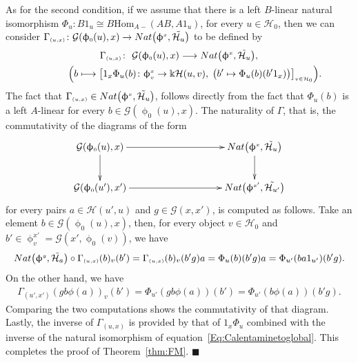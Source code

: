 \documentclass[11pt]{article}
\numberwithin{equation}{section}
\renewcommand{\hom}[3]{\mathrm{Hom}_{\Sscript{#1}}\left(#2, #3\right)}
\newcommand{\Ho}{\cH_{\Sscript{0}}}
\newcommand{\cG}{{\mathcal G}}
\newcommand{\cH}{{\mathcal H}}
\newcommand{\Sscript}[1]{\scriptscriptstyle{#1}}
\newcommand{\phio}{\upphi_{\Sscript{0}}}
\newcommand*{\QEDA}{\hfill\ensuremath{\blacksquare}}%
\begin{document}
As for the second condition, if we assume that there is a left $B$-linear natural isomorphism $\Phi_{u}\colon B1_{u} \cong B\hom{A-}{AB}{A1_{u}}$, for every $u \in \Ho$, then we can consider $\Gamma_{\Sscript{(u, x)}}\colon \cG(\phio(u),x) \to {\rm Nat}\big(\upphi^{\Sscript{x}}, \tilde{\cH_{u}}\big)$ to be defined by
\begin{gather*}
\Gamma_{\Sscript{(u, x)}}\colon \ \cG(\phio(u), x) \longrightarrow {\rm Nat}\big(\upphi^{\Sscript{x}}, \tilde{\cH_{u}}\big), \\
\hphantom{\Gamma_{\Sscript{(u, x)}}\colon}{} \ \Big( b \longmapsto \big[ 1_{x}\Phi_{u}(b)\colon \upphi^{\Sscript{x}} _{\Sscript{v}} \to \Bbbk \cH(u,v), \;\big( b' \mapsto
\Phi_{u}(b)(b'1_{x})\big) \big]_{\Sscript{v \in \Ho} } \Big).
\end{gather*}
The fact that $\Gamma_{\Sscript{(u, x)}} \in {\rm Nat}\big(\upphi^{\Sscript{x}}, \tilde{\cH_{u}}\big)$, follows directly from the fact that $\Phi_{u}(b)$ is a left $A$-linear for every $b \in \cG(\phio(u),x)$. The naturality of $\Gamma$, that is, the commutativity of the diagrams of the form
\begin{gather*}
\xymatrix@C=45pt{ \cG(\phio(u), x) \ar@{->}[rr] \ar@{->}[d] & & {\rm Nat}\big(\upphi^{\Sscript{x}}, \tilde{\cH_{u}}\big) \ar@{->}[d] \\ \cG(\phio(u'), x') \ar@{->}[rr] & & {\rm Nat}\big(\upphi^{\Sscript{x'}},
\tilde{\cH_{u'}}\big) }
\end{gather*}
for every pairs $ a \in \cH(u',u)$ and $g\in \cG(x,x')$, is computed as follows. Take an element $b \in \cG(\phio(u), x)$, then, for every object $v \in \Ho$ and $ b' \in
\upphi^{\Sscript{x'}}_{\Sscript{v}}=\cG(x',\phio(v))$, we have
\begin{gather*}
{\rm Nat}\big(\upphi^{\Sscript{g}}, \tilde{\cH_{a}}\big) \circ \Gamma_{\Sscript{(u, x)}}(b)_{v}(b') = \Gamma_{\Sscript{(u, x)}}(b)_{v}(b'g) a = \Phi_{u}(b)(b'g) a = \Phi_{u'}(ba1_{u'})(b'g).
\end{gather*}
On the other hand, we have
\begin{gather*}
\Gamma_{\Sscript{(u', x')}}(gb\phi(a))_{v}(b') = \Phi_{u'}(gb\phi(a))(b') = \Phi_{u'}(b\phi(a))(b'g).
\end{gather*}
Comparing the two computations shows the commutativity of that diagram. Lastly, the inverse of $\Gamma_{\Sscript{(u, x)}}$ is provided by that of $1_{x}\Phi_{u}$ combined with the inverse of the natural isomorphism of equation~\eqref{Eq:Calentaminetoglobal}. This completes the proof of Theorem~\ref{thm:FM}.
\QEDA
\end{document}
